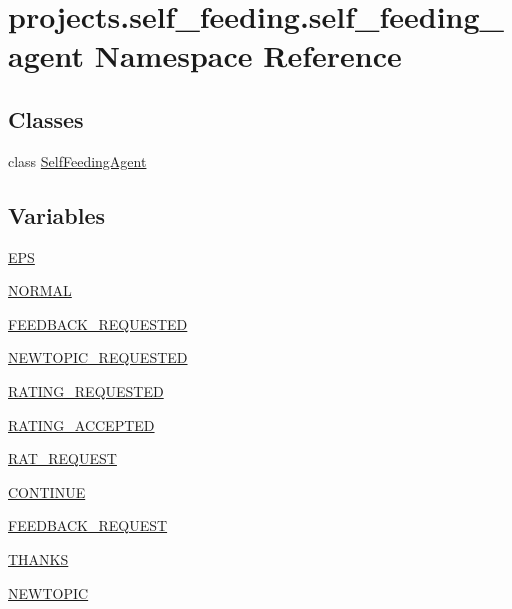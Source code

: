 \hypertarget{namespaceprojects_1_1self__feeding_1_1self__feeding__agent}{}\section{projects.\+self\+\_\+feeding.\+self\+\_\+feeding\+\_\+agent Namespace Reference}
\label{namespaceprojects_1_1self__feeding_1_1self__feeding__agent}
\subsection*{Classes}
\begin{DoxyCompactItemize}
\item 
class \hyperlink{classprojects_1_1self__feeding_1_1self__feeding__agent_1_1SelfFeedingAgent}{Self\+Feeding\+Agent}
\end{DoxyCompactItemize}
\subsection*{Variables}
\begin{DoxyCompactItemize}
\item 
\hyperlink{namespaceprojects_1_1self__feeding_1_1self__feeding__agent_a318d7b25578912ebc1df64d41e06eb1a}{E\+PS}
\item 
\hyperlink{namespaceprojects_1_1self__feeding_1_1self__feeding__agent_a35e34c23804f721abe3c68a4404944c1}{N\+O\+R\+M\+AL}
\item 
\hyperlink{namespaceprojects_1_1self__feeding_1_1self__feeding__agent_a33b132ddda8c924603a3ba34a5123b20}{F\+E\+E\+D\+B\+A\+C\+K\+\_\+\+R\+E\+Q\+U\+E\+S\+T\+ED}
\item 
\hyperlink{namespaceprojects_1_1self__feeding_1_1self__feeding__agent_a30ddc4434556e9fc8f6a74cdb573138f}{N\+E\+W\+T\+O\+P\+I\+C\+\_\+\+R\+E\+Q\+U\+E\+S\+T\+ED}
\item 
\hyperlink{namespaceprojects_1_1self__feeding_1_1self__feeding__agent_a161e2f9eab3fc63ae0103afd634dc01e}{R\+A\+T\+I\+N\+G\+\_\+\+R\+E\+Q\+U\+E\+S\+T\+ED}
\item 
\hyperlink{namespaceprojects_1_1self__feeding_1_1self__feeding__agent_aadf2dee133c92c6ce6f3a6f6af6085ed}{R\+A\+T\+I\+N\+G\+\_\+\+A\+C\+C\+E\+P\+T\+ED}
\item 
\hyperlink{namespaceprojects_1_1self__feeding_1_1self__feeding__agent_af869ef1f2d9d4d85e09da3a1fed067e4}{R\+A\+T\+\_\+\+R\+E\+Q\+U\+E\+ST}
\item 
\hyperlink{namespaceprojects_1_1self__feeding_1_1self__feeding__agent_a2b37e310fb95164baed89be37adb5669}{C\+O\+N\+T\+I\+N\+UE}
\item 
\hyperlink{namespaceprojects_1_1self__feeding_1_1self__feeding__agent_a662d16bd793fe31d92ffa2f617a0d8a0}{F\+E\+E\+D\+B\+A\+C\+K\+\_\+\+R\+E\+Q\+U\+E\+ST}
\item 
\hyperlink{namespaceprojects_1_1self__feeding_1_1self__feeding__agent_a411618d7f263948311e9d56860641e65}{T\+H\+A\+N\+KS}
\item 
\hyperlink{namespaceprojects_1_1self__feeding_1_1self__feeding__agent_a7bf1d3060e6fa10bae0e94fa6c42d0fc}{N\+E\+W\+T\+O\+P\+IC}
\end{DoxyCompactItemize}


